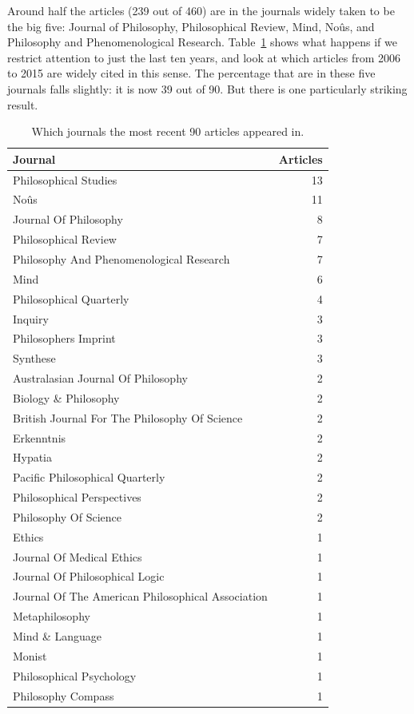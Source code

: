 \documentclass[
  10pt,
  letterpaper,
  DIV=11,
  numbers=noendperiod,
  twoside]{scrartcl}
\begin{document}
Around half the articles (239 out of 460) are in the journals widely
taken to be the big five: Journal of Philosophy, Philosophical Review,
Mind, Noûs, and Philosophy and Phenomenological Research.
Table~\ref{tbl-recent-journals-in-main-bib} shows what happens if we
restrict attention to just the last ten years, and look at which
articles from 2006 to 2015 are widely cited in this sense. The
percentage that are in these five journals falls slightly: it is now 39
out of 90. But there is one particularly striking result.

\begin{longtable}[]{@{}lr@{}}

\caption{\label{tbl-recent-journals-in-main-bib}Which journals the most
recent 90 articles appeared in.}

\tabularnewline

\toprule\noalign{}
Journal & Articles \\
\midrule\noalign{}
\endhead
\bottomrule\noalign{}
\endlastfoot
Philosophical Studies & 13 \\
Noûs & 11 \\
Journal Of Philosophy & 8 \\
Philosophical Review & 7 \\
Philosophy And Phenomenological Research & 7 \\
Mind & 6 \\
Philosophical Quarterly & 4 \\
Inquiry & 3 \\
Philosophers Imprint & 3 \\
Synthese & 3 \\
Australasian Journal Of Philosophy & 2 \\
Biology \& Philosophy & 2 \\
British Journal For The Philosophy Of Science & 2 \\
Erkenntnis & 2 \\
Hypatia & 2 \\
Pacific Philosophical Quarterly & 2 \\
Philosophical Perspectives & 2 \\
Philosophy Of Science & 2 \\
Ethics & 1 \\
Journal Of Medical Ethics & 1 \\
Journal Of Philosophical Logic & 1 \\
Journal Of The American Philosophical Association & 1 \\
Metaphilosophy & 1 \\
Mind \& Language & 1 \\
Monist & 1 \\
Philosophical Psychology & 1 \\
Philosophy Compass & 1 \\

\end{longtable}
\end{document}
